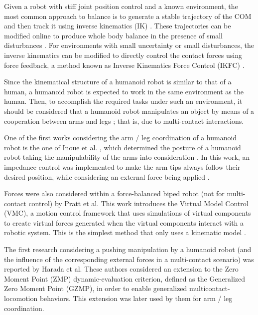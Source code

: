		Given a robot with stiff joint position control and a known environment, the most common approach
		to balance is to generate a stable trajectory of the COM and then track it using inverse kinematics
		(IK) \cite{Stephens_IROS2010}.
		These trajectories can be modified online to produce whole body balance in the presence of small
		disturbances \cite{Sugihara_IROS2002}.
		For environments with small uncertainty or small disturbances, the inverse kinematics can be modified
		to directly control the contact forces using force feedback, a method known as Inverse Kinematics
		Force Control (IKFC) \cite{Fujimoto_ICRA1996}.
		
		Since the kinematical structure of a humanoid robot is similar to that of a human, a humanoid
		robot	is expected to work in the same environment as the human.
		Then, to accomplish the required tasks under such an environment, it should be considered that
		a	humanoid robot manipulates an object by means of a cooperation between arms and legs
		\cite{Harada_ICRA2003}; that is, due to multi-contact interactions.
		
		One of the first works considering the arm / leg coordination of a humanoid robot is the one of
		Inoue et al. \cite{Inoue_ICRA2000}, which determined the posture of a humanoid robot taking the
		manipulability of the arms into consideration \cite{Harada_IROS2003}.
		In this work, an impedance control was implemented to make the arm tips always follow their desired
		position, while considering	an external force	being applied \cite{Inoue_ICRA2000}.
		
		Forces were also considered within a force-balanced biped robot (not for multi-contact control)
		by Pratt et al. \cite{Pratt_IJRR2001}
		This work introduces the Virtual Model Control (VMC), a motion control framework that uses
		simulations of virtual components to create virtual forces generated when the virtual components
		interact with a robotic system.
		This is the simplest method that only uses a kinematic model \cite{Stephens_IROS2010}.
		
		The first research considering a pushing manipulation by a humanoid robot
		(and the influence of	the corresponding external forces in a multi-contact scenario)
		was reported by Harada et al. \cite{Harada_ICRA2003}
		These authors considered an extension to the Zero Moment Point (ZMP) dynamic-evaluation
		criterion, defined as the Generalized Zero Moment Point (GZMP), in order to enable generalized
		multicontact-locomotion behaviors.
		This extension was later used by them \cite{Harada_IROS2003} for arm / leg coordination.
		
